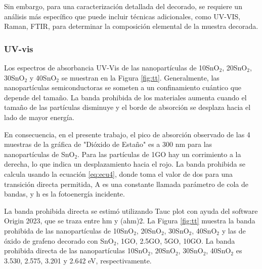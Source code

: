\documentclass[12pt]{article}
\begin{document}
 Sin embargo, para una caracterización detallada del decorado, se requiere un análisis más específico que puede incluir técnicas adicionales, como UV-VIS, Raman, FTIR, para determinar la composición elemental de la muestra decorada.
 

\subsubsection{UV-vis}

Los espectros de absorbancia UV-Vis de las nanopartículas de 10SnO$\displaystyle _{2}$, 20SnO$\displaystyle _{2}$, 30SnO$\displaystyle _{2}$ y 40SnO$\displaystyle _{2}$ se muestran en la  Figura \ref{fig:tt}. 
Generalmente, las nanopartículas semiconductoras se someten a un confinamiento cuántico que depende del tamaño. La banda prohibida de los materiales aumenta cuando el tamaño de las partículas disminuye y el borde de absorción se desplaza hacia el lado de mayor energía.\vspace{1em} %

En consecuencia, en el presente trabajo, el pico de absorción observado de las 4 muestras de la gráfica de "Dióxido de Estaño" es a 300 nm para las nanopartículas de SnO$\displaystyle _{2}$. Para las partículas de 1GO hay un corrimiento a la derecha, lo que indica un desplazamiento hacia el rojo. La banda prohibida se calcula usando la ecuación \ref{eq:ecu4}, donde toma el valor de dos para una transición directa permitida, A es una constante llamada parámetro de cola de bandas, y h es la fotoenergía incidente.
\vspace{1em} %

La banda prohibida directa se estimó utilizando Tauc plot con ayuda del software Origin 2023, que se traza entre hm y (ahm)2. La Figura \ref{fig:tt}  muestra la banda prohibida de las nanopartículas de 10SnO$\displaystyle _{2}$, 20SnO$\displaystyle _{2}$, 30SnO$\displaystyle _{2}$, 40SnO$\displaystyle _{2}$ y las de óxido de grafeno decorado con SnO$\displaystyle _{2}$, 1GO, 2.5GO, 5GO, 10GO. La banda prohibida directa de las nanopartículas 10SnO$\displaystyle _{2}$, 20SnO$\displaystyle _{2}$, 30SnO$\displaystyle _{2}$, 40SnO$\displaystyle _{2}$ es 3.530, 2.575, 3.201 y 2.642 eV, respectivamente.
\end{document}

